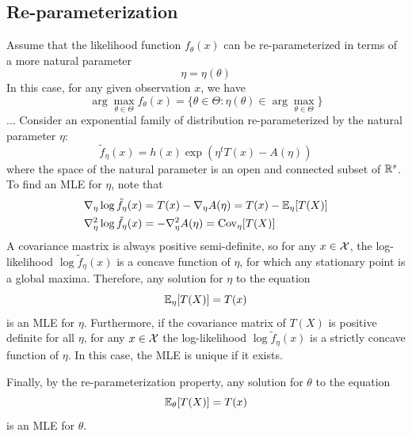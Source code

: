 \documentclass[11pt]{book}
\begin{document}
\subsection{Re-parameterization}
Assume that the likelihood function $f_\theta(x)$ can be re-parameterized in terms of a more natural parameter 
\[
  \eta = \eta(\theta)
\]
In this case, for any given observation $x$, we have 
\[
  \arg\max_{\theta\in\Theta} f_\theta(x) = \{ \theta \in \Theta : \eta(\theta) \in \arg\max_{\theta\in\Theta} \}
\] ... %
Consider an exponential family of distribution re-parameterized by the natural parameter $\eta$: 
\[
  \tilde{f}_\eta(x) = h(x) \exp(\eta^t T(x) - A(\eta))
\]
where the space of the natural parameter is an open and connected subset of $\mathbb{R}^s$. To find an MLE for $\eta$, note that 
\begin{align*}
  \nabla_\eta \log\tilde{f}_\eta(x) &= T(x) - \nabla_\eta A(\eta) = T(x) - \mathbb{E}_\eta[T(X)] \\ 
  \nabla_\eta^2 \log \tilde{f}_\eta(x) &= -\nabla_\eta^2 A(\eta) = \mathrm{Cov}_\eta[T(X)]
\end{align*}
A covariance mastrix is always positive semi-definite, so for any $x\in\mathcal{X}$, the log-likelihood $\log\tilde{f}_\eta(x)$ is a concave function of $\eta$, for which any stationary point is a global maxima. Therefore,
any solution for $\eta$ to the equation 
\[
  \mathbb{E}_\eta[T(X)] = T(x)
\] 
is an MLE for $\eta$. Furthermore, if the covariance matrix of $T(X)$ is positive definite for all 
$\eta$, for any $x \in \mathcal{X}$ the log-likelihood $\log\tilde{f}_\eta(x)$ is a strictly concave function of $\eta$. In this case, the MLE is unique if it exists.

Finally, by the re-parameterization property, any solution for $\theta$ to the equation 
\[
  \mathbb{E}_\theta[T(X)] = T(x)
\]
is an MLE for $\theta$.
\end{document}
